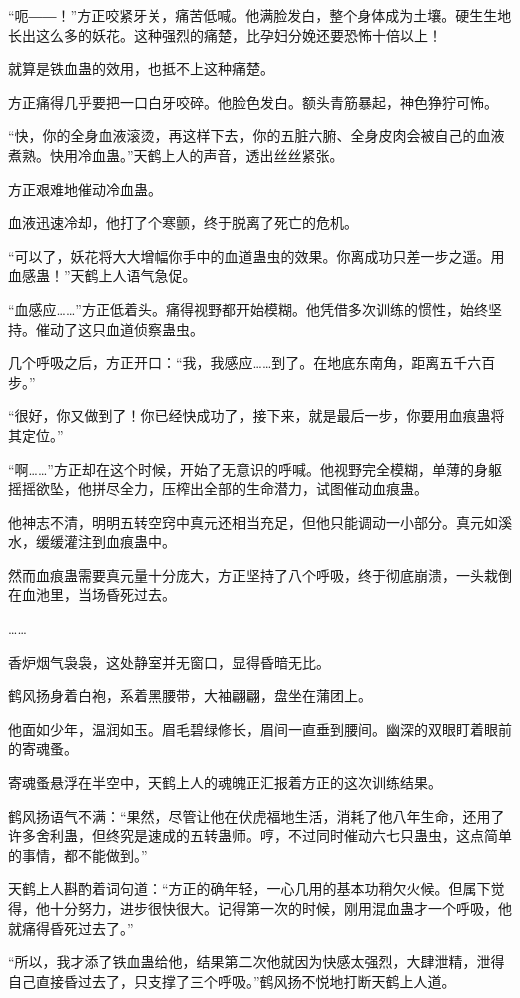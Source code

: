 \begin{this_body}
“呃――！”方正咬紧牙关，痛苦低喊。他满脸发白，整个身体成为土壤。硬生生地长出这么多的妖花。这种强烈的痛楚，比孕妇分娩还要恐怖十倍以上！

就算是铁血蛊的效用，也抵不上这种痛楚。

方正痛得几乎要把一口白牙咬碎。他脸色发白。额头青筋暴起，神色狰狞可怖。

“快，你的全身血液滚烫，再这样下去，你的五脏六腑、全身皮肉会被自己的血液煮熟。快用冷血蛊。”天鹤上人的声音，透出丝丝紧张。

方正艰难地催动冷血蛊。

血液迅速冷却，他打了个寒颤，终于脱离了死亡的危机。

“可以了，妖花将大大增幅你手中的血道蛊虫的效果。你离成功只差一步之遥。用血感蛊！”天鹤上人语气急促。

“血感应……”方正低着头。痛得视野都开始模糊。他凭借多次训练的惯性，始终坚持。催动了这只血道侦察蛊虫。

几个呼吸之后，方正开口：“我，我感应……到了。在地底东南角，距离五千六百步。”

“很好，你又做到了！你已经快成功了，接下来，就是最后一步，你要用血痕蛊将其定位。”

“啊……”方正却在这个时候，开始了无意识的呼喊。他视野完全模糊，单薄的身躯摇摇欲坠，他拼尽全力，压榨出全部的生命潜力，试图催动血痕蛊。

他神志不清，明明五转空窍中真元还相当充足，但他只能调动一小部分。真元如溪水，缓缓灌注到血痕蛊中。

然而血痕蛊需要真元量十分庞大，方正坚持了八个呼吸，终于彻底崩溃，一头栽倒在血池里，当场昏死过去。

……

香炉烟气袅袅，这处静室并无窗口，显得昏暗无比。

鹤风扬身着白袍，系着黑腰带，大袖翩翩，盘坐在蒲团上。

他面如少年，温润如玉。眉毛碧绿修长，眉间一直垂到腰间。幽深的双眼盯着眼前的寄魂蚤。

寄魂蚤悬浮在半空中，天鹤上人的魂魄正汇报着方正的这次训练结果。

鹤风扬语气不满：“果然，尽管让他在伏虎福地生活，消耗了他八年生命，还用了许多舍利蛊，但终究是速成的五转蛊师。哼，不过同时催动六七只蛊虫，这点简单的事情，都不能做到。”

天鹤上人斟酌着词句道：“方正的确年轻，一心几用的基本功稍欠火候。但属下觉得，他十分努力，进步很快很大。记得第一次的时候，刚用混血蛊才一个呼吸，他就痛得昏死过去了。”

“所以，我才添了铁血蛊给他，结果第二次他就因为快感太强烈，大肆泄精，泄得自己直接昏过去了，只支撑了三个呼吸。”鹤风扬不悦地打断天鹤上人道。


\end{this_body}
